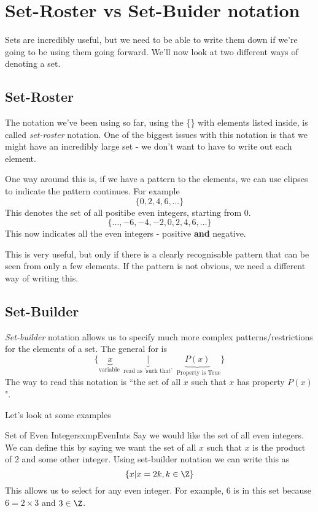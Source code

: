 \section{Set-Roster vs Set-Buider notation}

Sets are incredibly useful, but we need to be able to write them down if we're going to be using them going forward. We'll now look at two different ways of denoting a set.

\subsection*{Set-Roster}
The notation we've been using so far, using the \{\} with elements listed inside, is called \emph{set-roster} notation. One of the biggest issues with this notation is that we might have an incredibly large set - we don't want to have to write out each element.

One way aroumd this is, if we have a pattern to the elements, we can use elipses to indicate the pattern continues. For example
$$\{0,2,4,6,\dots\}$$
This denotes the set of all positibe even integers, starting from 0.
$$\{\dots,-6,-4,-2,0,2,4,6,\dots\}$$
This now indicates all the even integers - positive \textbf{and} negative.

This is very useful, but only if there is a clearly recognisable pattern that can be seen from only a few elements. If the pattern is not obvious, we need a different way of writing this.

\subsection*{Set-Builder}
\emph{Set-builder} notation allows us to specify much more complex patterns/restrictions for the elements of a set. The general for is
$$\{\underbrace{x}_{\text{variable }} \underbrace{|}_{\text{ read as 'such that' }} \underbrace{P(x)}_{\text{ Property is True}}\}$$
The way to read this notation is ``the set of all $x$ such that $x$ has property $P(x)$".

Let's look at some examples
\begin{exmpl}[label={exmpl:evenints}]{Set of Even Integers}{xmpEvenInts}
    Say we would like the set of all even integers. We can define this by saying we want the set of all $x$ such that $x$ is the product of 2 and some other integer. Using set-builder notation we can write this as
    $$\{x | x = 2k, k \in \Z\}$$
    This allows us to select for any even integer. For example, 6 is in this set because $6 = 2 \times 3$ and $3 \in \Z$.
\end{exmpl}

